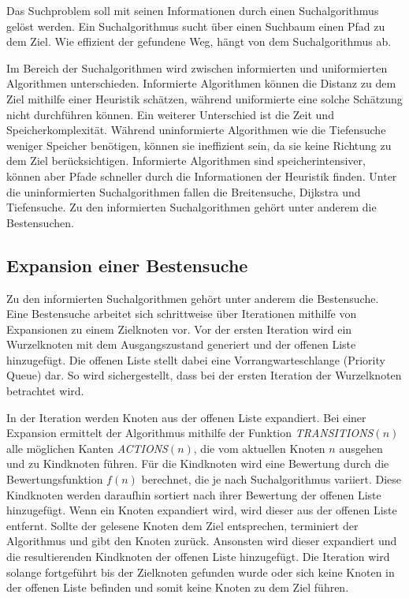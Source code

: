 Das Suchproblem soll mit seinen Informationen durch einen Suchalgorithmus gel\"{o}st werden. Ein Suchalgorithmus sucht \"{u}ber einen Suchbaum einen Pfad zu dem Ziel. Wie effizient der gefundene Weg, h\"{a}ngt von dem Suchalgorithmus ab. 

Im Bereich der Suchalgorithmen wird zwischen informierten und uniformierten Algorithmen unterschieden. Informierte Algorithmen k\"{o}nnen die Distanz zu dem Ziel mithilfe einer Heuristik sch\"{a}tzen, w\"{a}hrend uniformierte eine solche Sch\"{a}tzung nicht durchf\"{u}hren k\"{o}nnen. Ein weiterer Unterschied ist die Zeit und Speicherkomplexit\"{a}t. W\"{a}hrend uninformierte Algorithmen wie die Tiefensuche weniger Speicher ben\"{o}tigen, k\"{o}nnen sie ineffizient sein, da sie keine Richtung zu dem Ziel ber\"{u}cksichtigen. Informierte Algorithmen sind speicherintensiver, k\"{o}nnen aber Pfade schneller durch die Informationen der Heuristik finden. Unter die uninformierten Suchalgorithmen fallen die Breitensuche, Dijkstra und Tiefensuche. Zu den informierten Suchalgorithmen geh\"{o}rt unter anderem die Bestensuchen.


\subsection{Expansion einer Bestensuche}
\label{chap:bestensuche}

Zu den informierten Suchalgorithmen geh\"{o}rt unter anderem die Bestensuche. Eine Bestensuche arbeitet sich schrittweise \"{u}ber Iterationen mithilfe von Expansionen zu einem Zielknoten vor. Vor der ersten Iteration wird ein Wurzelknoten mit dem Ausgangszustand generiert und der offenen Liste hinzugef\"{u}gt. Die offenen Liste stellt dabei eine Vorrangwarteschlange (Priority Queue) dar. So wird sichergestellt, dass bei der ersten Iteration der Wurzelknoten betrachtet wird.

In der Iteration werden Knoten aus der offenen Liste expandiert. Bei einer Expansion ermittelt der Algorithmus mithilfe der Funktion \textit{TRANSITIONS}$(n)$ alle m\"{o}glichen Kanten \textit{ACTIONS}$(n)$, die vom aktuellen Knoten $n$ ausgehen und zu Kindknoten f\"{u}hren. F\"{u}r die Kindknoten wird eine Bewertung durch die Bewertungsfunktion $f(n)$ berechnet, die je nach Suchalgorithmus variiert. Diese Kindknoten werden daraufhin sortiert nach ihrer Bewertung der offenen Liste hinzugef\"{u}gt. Wenn ein Knoten expandiert wird, wird dieser aus der offenen Liste entfernt. Sollte der gelesene Knoten dem Ziel entsprechen, terminiert der Algorithmus und gibt den Knoten zur\"{u}ck. Ansonsten wird dieser expandiert und die resultierenden Kindknoten der offenen Liste hinzugef\"{u}gt. Die Iteration wird solange fortgef\"{u}hrt bis der Zielknoten gefunden wurde oder sich keine Knoten in der offenen Liste befinden und somit keine Knoten zu dem Ziel f\"{u}hren.

